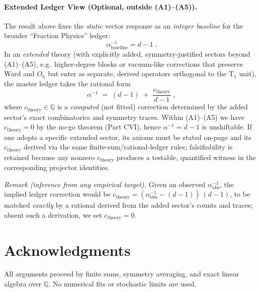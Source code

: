 \paragraph{Extended Ledger View (Optional, outside (A1)--(A5)).}
The result above fixes the \emph{static} vector response as an \emph{integer baseline} for the broader “Fraction Physics” ledger:
\[
\boxed{\ \alpha^{-1}_{\text{baseline}}=d-1\ }.
\]
In an \emph{extended} theory (with explicitly added, symmetry-justified sectors beyond (A1)--(A5), e.g.\ higher-degree blocks or vacuum-like corrections that preserve Ward and $O_h$ but enter as separate, derived operators orthogonal to the T$_1$ unit), the master ledger takes the rational form
\[
\boxed{\ \alpha^{-1} \;=\; (d-1)\;+\;\frac{c_{\mathrm{theory}}}{\,d-1\,}\ },
\]
where $c_{\mathrm{theory}} \in \mathbb{Q}$ is a \emph{computed} (not fitted) correction determined by the added sector’s exact combinatorics and symmetry traces.
Within (A1)--(A5) we have $c_{\mathrm{theory}}=0$ by the no-go theorem (Part CVI), hence $\alpha^{-1}=d-1$ is unshiftable.
If one adopts a specific extended sector, its axioms must be stated on-page and its $c_{\mathrm{theory}}$ derived via the same finite-sum/rational-ledger rules; falsifiability is retained because any nonzero $c_{\mathrm{theory}}$ produces a testable, quantified witness in the corresponding projector identities.

\emph{Remark (inference from any empirical target).} Given an observed $\alpha^{-1}_{\text{obs}}$, the implied ledger correction would be
\(
c_{\mathrm{theory}}=(\alpha^{-1}_{\text{obs}}-(d-1))\,(d-1)
\),
to be matched \emph{exactly} by a rational derived from the added sector’s counts and traces; absent such a derivation, we set $c_{\mathrm{theory}}=0$.


\section*{Acknowledgments}
All arguments proceed by finite sums, symmetry averaging, and exact linear algebra over \(\mathbb{Q}\). No numerical fits or stochastic limits are used.
